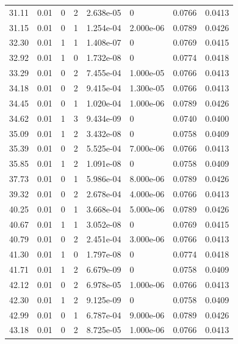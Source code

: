 \documentclass[preview]{standalone}
\begin{document}
{{{\begin{tabular}{L{1.2cm}C{1.2cm} C{0.3cm}C{0.5cm} C{1.4cm}C{1.4cm} C{1.4cm}C{1.4cm}}
  31.11  &  0.01  & 0     &  2 &  2.638e-05  & 0  & 0.0766 &  0.0413   \\ 
  31.15  &  0.01  & 0     &  1 &  1.254e-04  & 2.000e-06  & 0.0789 &  0.0426   \\ 
  32.30  &  0.01  & 1     &  1 &  1.408e-07  & 0  & 0.0769 &  0.0415   \\ 
  32.92  &  0.01  & 1     &  0 &  1.732e-08  & 0  & 0.0774 &  0.0418   \\ 
  33.29  &  0.01  & 0     &  2 &  7.455e-04  & 1.000e-05  & 0.0766 &  0.0413   \\ 
  34.18  &  0.01  & 0     &  2 &  9.415e-04  & 1.300e-05  & 0.0766 &  0.0413   \\ 
  34.45  &  0.01  & 0     &  1 &  1.020e-04  & 1.000e-06  & 0.0789 &  0.0426   \\ 
  34.62  &  0.01  & 1     &  3 &  9.434e-09  & 0  & 0.0740 &  0.0400   \\ 
  35.09  &  0.01  & 1     &  2 &  3.432e-08  & 0  & 0.0758 &  0.0409   \\ 
  35.39  &  0.01  & 0     &  2 &  5.525e-04  & 7.000e-06  & 0.0766 &  0.0413   \\ 
  35.85  &  0.01  & 1     &  2 &  1.091e-08  & 0  & 0.0758 &  0.0409   \\ 
  37.73  &  0.01  & 0     &  1 &  5.986e-04  & 8.000e-06  & 0.0789 &  0.0426   \\ 
  39.32  &  0.01  & 0     &  2 &  2.678e-04  & 4.000e-06  & 0.0766 &  0.0413   \\ 
  40.25  &  0.01  & 0     &  1 &  3.668e-04  & 5.000e-06  & 0.0789 &  0.0426   \\ 
  40.67  &  0.01  & 1     &  1 &  3.052e-08  & 0  & 0.0769 &  0.0415   \\ 
  40.79  &  0.01  & 0     &  2 &  2.451e-04  & 3.000e-06  & 0.0766 &  0.0413   \\ 
  41.30  &  0.01  & 1     &  0 &  1.797e-08  & 0  & 0.0774 &  0.0418   \\ 
  41.71  &  0.01  & 1     &  2 &  6.679e-09  & 0  & 0.0758 &  0.0409   \\ 
  42.12  &  0.01  & 0     &  2 &  6.978e-05  & 1.000e-06  & 0.0766 &  0.0413   \\ 
  42.30  &  0.01  & 1     &  2 &  9.125e-09  & 0  & 0.0758 &  0.0409   \\ 
  42.99  &  0.01  & 0     &  1 &  6.787e-04  & 9.000e-06  & 0.0789 &  0.0426   \\ 
  43.18  &  0.01  & 0     &  2 &  8.725e-05  & 1.000e-06  & 0.0766 &  0.0413   \\ 

\end{tabular}}}}
\end{document}
